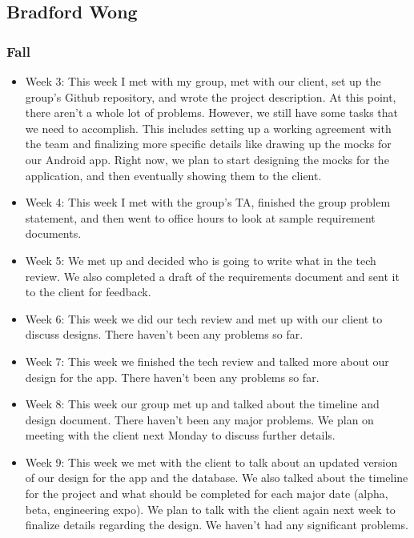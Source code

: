 \documentclass[onecolumn, draftclsnofoot,10pt, compsoc]{IEEEtran}
\begin{document}
 \subsection{Bradford Wong}
 \subsubsection{Fall}
 \begin{itemize}
     \item Week 3: This week I met with my group, met with our client, set up the group's Github repository, and wrote the project description. At this point, there aren't a whole lot of problems. However, we still have some tasks that we need to accomplish. This includes setting up a working agreement with the team and finalizing more specific details like drawing up the mocks for our Android app. Right now, we plan to start designing the mocks for the application, and then eventually showing them to the client.  
     \item Week 4: This week I met with the group's TA, finished the group problem statement, and then went to office hours to look at sample requirement documents.
     \item Week 5: We met up and decided who is going to write what in the tech review. We also completed a draft of the requirements document and sent it to the client for feedback.
     \item Week 6: This week we did our tech review and met up with our client to discuss designs. There haven't been any problems so far.
     \item Week 7: This week we finished the tech review and talked more about our design for the app. There haven't been any problems so far.
     \item Week 8: This week our group met up and talked about the timeline and design document. There haven't been any major problems. We plan on meeting with the client next Monday to discuss further details.
     \item Week 9: This week we met with the client to talk about an updated version of our design for the app and the database. We also talked about the timeline for the project and what should be completed for each major date (alpha, beta, engineering expo). We plan to talk with the client again next week to finalize details regarding the design. We haven't had any significant problems.
 \end{itemize}
 
\end{document}
